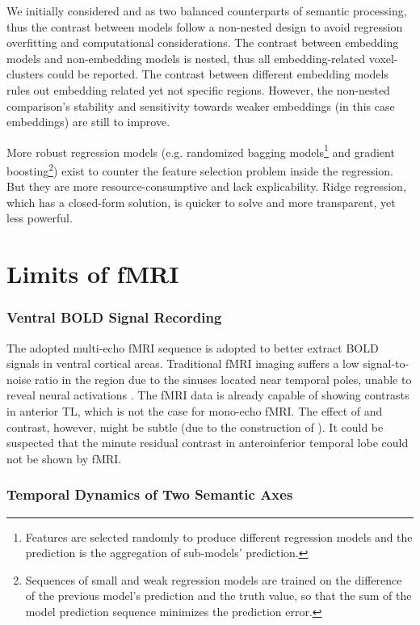 We initially considered \similarity and \association as two balanced counterparts of semantic processing, thus the contrast between models follow a non-nested design to avoid regression overfitting and computational considerations. The contrast between embedding models and non-embedding models is nested, thus all embedding-related voxel-clusters could be reported. The contrast between different embedding models rules out embedding related yet not specific regions. However, the non-nested comparison's stability and sensitivity towards weaker embeddings (in this case \similarity embeddings) are still to improve. 

More robust regression models (e.g. randomized bagging models\footnote{Features are selected randomly to produce different regression models and the prediction is the aggregation of sub-models' prediction.} and gradient boosting\footnote{Sequences of small and weak regression models are trained on the difference of the previous model's prediction and the truth value, so that the sum of the model prediction sequence minimizes the prediction error.}) exist to counter the feature selection problem inside the regression. But they are more resource-consumptive and lack explicability. Ridge regression, which has a closed-form solution, is quicker to solve and more transparent, yet less powerful. 

\section{Limits of fMRI}

\subsubsection{Ventral BOLD Signal Recording}

The adopted multi-echo fMRI sequence is adopted to better extract BOLD signals in ventral cortical areas. Traditional fMRI imaging suffers a low signal-to-noise ratio in the region due to the sinuses located near temporal poles, unable to reveal neural activations \parencite{devlinSusceptibilityInducedLossSignal2000}. The fMRI data is already capable of showing contrasts in anterior TL, which is not the case for mono-echo fMRI. The effect of \similarity and \association contrast, however, might be subtle (due to the construction of ). It could be suspected that the minute residual contrast in anteroinferior temporal lobe could not be shown by fMRI.

\subsubsection{Temporal Dynamics of Two Semantic Axes}

